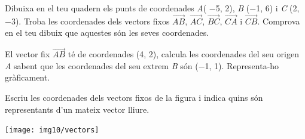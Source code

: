 \begin{mylist}
\exer  Dibuixa en el teu quadern els punts de coordenades \textit{A}(  $-$5, 2), \textit{B} ($-$1, 6) i \textit{C} (2, $-$3). Troba les coordenades dels vectors fixos $\overrightarrow{AB}$, $\overrightarrow{AC}$, $\overrightarrow{BC}$, $\overrightarrow{CA}$ i $\overrightarrow{CB}$. Comprova en el teu dibuix que aquestes són les seves coordenades.
 
\exer  El vector fix $\overrightarrow{AB}$ té de coordenades (4, 2), calcula les coordenades del seu origen \textit{A} sabent que les coordenades del seu extrem \textit{B} són ($-$1, 1). Representa-ho gràficament.

\vspace{-1.8cm}
\exer \begin{minipage}[t]{0.5\textwidth}
	Escriu les coordenades dels vectors fixos de la figura i indica quins són representants d'un mateix vector lliure.
\end{minipage}
\begin{minipage}{0.5\textwidth}
	\centering
	\vspace{1.5cm}
	\texttt{[image: img10/vectors]}
\end{minipage}



\end{mylist}
